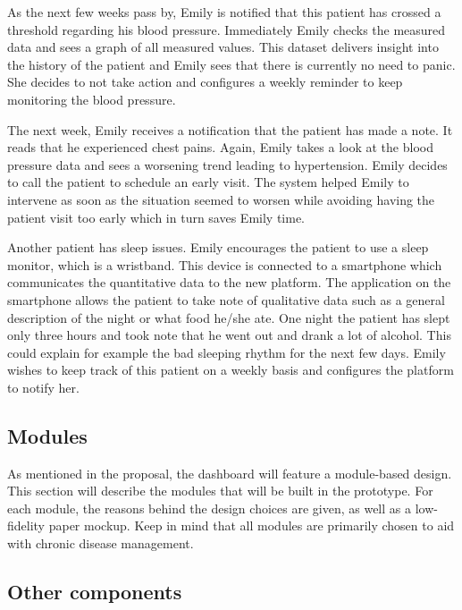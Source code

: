         As the next few weeks pass by, Emily is notified that this patient has crossed a threshold regarding his blood pressure. Immediately Emily checks the measured data and sees a graph of all measured values. This dataset delivers insight into the history of the patient and Emily sees that there is currently no need to panic. She decides to not take action and configures a weekly reminder to keep monitoring the blood pressure.
        
        The next week, Emily receives a notification that the patient has made a note. It reads that he experienced chest pains. Again, Emily takes a look at the blood pressure data and sees a worsening trend leading to hypertension. Emily decides to call the patient to schedule an early visit. The system helped Emily to intervene as soon as the situation seemed to worsen while avoiding having the patient visit too early which in turn saves Emily time.
        
        Another patient has sleep issues. Emily encourages the patient to use a sleep monitor, which is a wristband. This device is connected to a smartphone which communicates the quantitative data to the new platform. The application on the smartphone allows the patient to take note of qualitative data such as a general description of the night or what food he/she ate. One night the patient has slept only three hours and took note that he went out and drank a lot of alcohol. This could explain for example the bad sleeping rhythm for the next few days. Emily wishes to keep track of this patient on a weekly basis and configures the platform to notify her. 
        
    \subsection{Modules}
    
        As mentioned in the proposal, the dashboard will feature a module-based design. This section will describe the modules that will be built in the prototype. For each module, the reasons behind the design choices are given, as well as a low-fidelity paper mockup. Keep in mind that all modules are primarily chosen to aid with chronic disease management.

    \subsection{Other components}